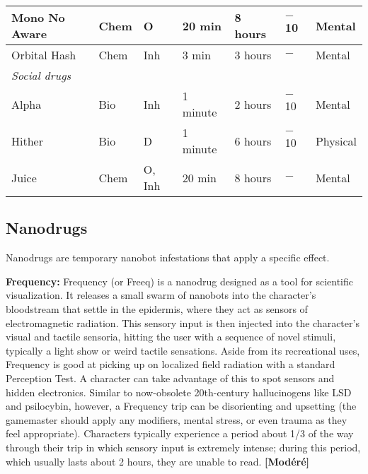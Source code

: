{{\begin{table}
\begin{tabularx}{\textwidth}{|X|l|l|l|l|X|X|}
Mono No Aware	&Chem	&O	&20 min	&8 hours	&$-$10	&Mental	\\ \hline

Orbital Hash	&Chem	&Inh	&3 min	&3 hours	&$-$	&Mental	\\ \hline

\multicolumn{7}{|l|}{\emph{Social drugs}}	\\ \hline

Alpha	&Bio	&Inh	&1 minute	&2 hours	&$-$10	&Mental	\\ \hline

Hither	&Bio	&D	&1 minute	&6 hours	&$-$10	&Physical	\\ \hline

Juice	&Chem	&O, Inh	&20 min	&8 hours	&$-$	&Mental	\\ \hline

\end{tabularx} \end{table} 

\clearpage



\label{tab:drugs} 



\subsection{Nanodrugs} \label{sec:nanodrugs} 

Nanodrugs are temporary nanobot infestations that apply a specific effect. 

\textbf{Frequency:} Frequency (or Freeq) is a nanodrug designed as a tool for scientific visualization. It releases a small swarm of nanobots into the character’s bloodstream that settle in the epidermis, where they act as sensors of electromagnetic radiation. This sensory input is then injected into the character’s visual and tactile sensoria, hitting the user with a sequence of novel stimuli, typically a light show or weird tactile sensations. Aside from its recreational uses, Frequency is good at picking up on localized field radiation with a standard Perception Test. A character can take advantage of this to spot sensors and hidden electronics. Similar to now-obsolete 20th-century hallucinogens like LSD and psilocybin, however, a Frequency trip can be disorienting and upsetting (the gamemaster should apply any modifiers, mental stress, or even trauma as they feel appropriate). Characters typically experience a period about 1/3 of the way through their trip in which sensory input is extremely intense; during this period, which usually lasts about 2 hours, they are unable to read. \textbf{[Modéré]} 

}}

